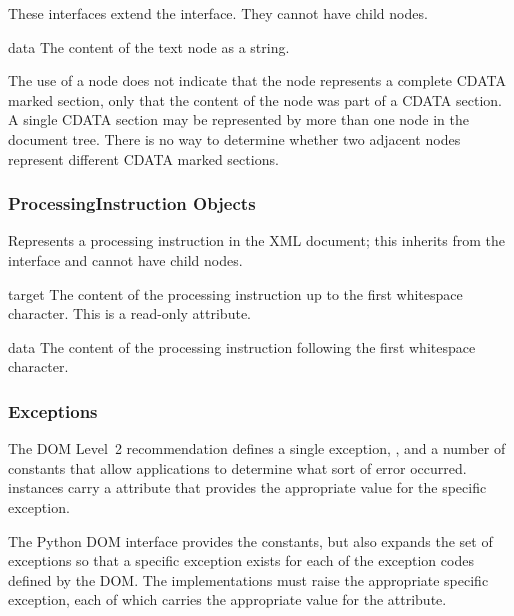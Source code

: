 These interfaces extend the  interface.  They cannot have
child nodes.

\begin{memberdesc}[Text]{data}
The content of the text node as a string.
\end{memberdesc}

\begin{notice}
  The use of a  node does not indicate that the
  node represents a complete CDATA marked section, only that the
  content of the node was part of a CDATA section.  A single CDATA
  section may be represented by more than one node in the document
  tree.  There is no way to determine whether two adjacent
   nodes represent different CDATA marked
  sections.
\end{notice}


\subsubsection{ProcessingInstruction Objects \label{dom-pi-objects}}

Represents a processing instruction in the XML document; this inherits
from the  interface and cannot have child nodes.

\begin{memberdesc}[ProcessingInstruction]{target}
The content of the processing instruction up to the first whitespace
character.  This is a read-only attribute.
\end{memberdesc}

\begin{memberdesc}[ProcessingInstruction]{data}
The content of the processing instruction following the first
whitespace character.
\end{memberdesc}


\subsubsection{Exceptions \label{dom-exceptions}}


The DOM Level~2 recommendation defines a single exception,
, and a number of constants that allow
applications to determine what sort of error occurred.
 instances carry a  attribute
that provides the appropriate value for the specific exception.

The Python DOM interface provides the constants, but also expands the
set of exceptions so that a specific exception exists for each of the
exception codes defined by the DOM.  The implementations must raise
the appropriate specific exception, each of which carries the
appropriate value for the  attribute.

